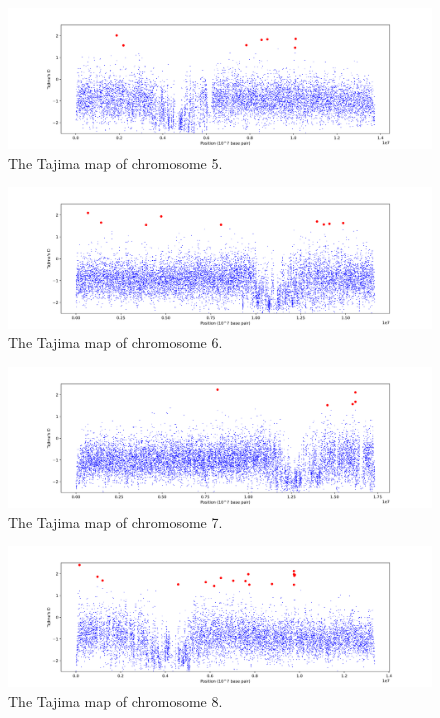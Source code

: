 \begin{figure}[h!]
    \centering
    \includegraphics[scale=0.4]{figs/Appx5.png}
    \caption{The Tajima map of chromosome 5.}
    \label{fig:10}
\end{figure}

\begin{figure}[h!]
    \centering
    \includegraphics[scale=0.4]{figs/Appx6.png}
    \caption{The Tajima map of chromosome 6.}
    \label{fig:11}
\end{figure}

\begin{figure}[h!]
    \centering
    \includegraphics[scale=0.4]{figs/Appx7.png}
    \caption{The Tajima map of chromosome 7.}
    \label{fig:12}
\end{figure}

\begin{figure}[h!]
    \centering
    \includegraphics[scale=0.4]{figs/Appx8.png}
    \caption{The Tajima map of chromosome 8.}
    \label{fig:13}
\end{figure}


